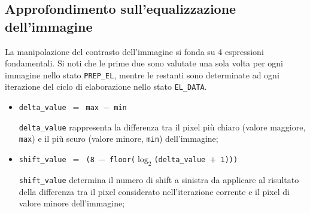 \documentclass{article}
\begin{document}
\subsection{Approfondimento sull'equalizzazione dell'immagine} %
\label{sec:appr}
La manipolazione del contrasto dell’immagine si fonda su 4 espressioni fondamentali. Si noti che le prime due sono valutate una sola volta per ogni immagine nello stato \texttt{PREP\_EL}, mentre le restanti sono determinate ad ogni iterazione del ciclo di elaborazione nello stato \texttt{EL\_DATA}.
\begin{itemize}
    \item   \texttt{delta\_value $=$ max $-$ min}\par
          \texttt{delta\_value} rappresenta la differenza tra il pixel più chiaro (valore maggiore, \texttt{max}) e il più scuro (valore minore, \texttt{min}) dell’immagine;
    \item   \texttt{shift\_value $=$ (8 $-$ floor\footnotemark($\log_{2} $(delta\_value $+$ 1)))}\par
          \texttt{shift\_value} determina il numero di shift a sinistra da applicare al risultato della differenza tra il pixel considerato nell’iterazione corrente e il pixel di valore minore dell’immagine;


\end{itemize}
\end{document}
